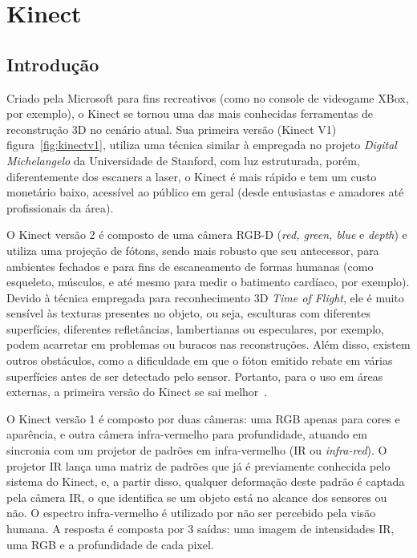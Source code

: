 \section{Kinect}

\subsection{Introdução}

Criado pela Microsoft para fins recreativos (como no console de videogame XBox, por
exemplo), o Kinect se tornou uma das mais conhecidas ferramentas de reconstrução 3D no
cenário atual. Sua primeira versão (Kinect V1) figura~\ref{fig:kinectv1}, utiliza uma
técnica similar à empregada no projeto \emph{Digital Michelangelo} da Universidade de Stanford, com luz
estruturada, porém, diferentemente dos escaners a laser, o Kinect é mais rápido e tem um
custo monetário baixo, acessível ao público em geral (desde entusiastas
e amadores até profissionais da área). 

O Kinect versão 2 é composto de uma câmera RGB-D (\emph{red, green, blue} e
\emph{depth}) e utiliza uma projeção de fótons, sendo mais robusto que seu
antecessor, para ambientes fechados e para fins de escaneamento de formas
humanas (como esqueleto, músculos, e até mesmo para medir o batimento cardíaco, por exemplo). Devido à
técnica empregada para reconhecimento 3D \emph{Time of Flight},
ele é muito sensível às texturas presentes no objeto, ou seja, esculturas
com diferentes superfícies, diferentes refletâncias, lambertianas ou
especulares, por exemplo, podem acarretar em problemas ou buracos nas reconstruções. Além
disso, existem outros obstáculos, como a dificuldade em que o fóton emitido 
rebate em várias superfícies antes de ser detectado pelo sensor. 
Portanto, para o uso em áreas externas, a primeira versão do Kinect se sai melhor~\cite{DBLP:journals/corr/FreedmanKSLS14}.

O Kinect versão 1 é composto por duas câmeras: uma RGB apenas para cores e aparência,
e outra câmera infra-vermelho para profundidade, atuando em sincronia com um projetor de padrões em infra-vermelho (IR ou \emph{infra-red}). O projetor IR lança uma matriz de padrões que já é previamente
conhecida pelo sistema do Kinect, e, a partir disso, qualquer deformação deste
padrão é captada pela câmera IR, o que identifica se um objeto está no alcance
dos sensores ou não. O espectro infra-vermelho é utilizado por não ser percebido pela visão humana.
A resposta é composta por 3 saídas: uma imagem de intensidades IR, uma RGB e a profundidade de cada pixel. 

